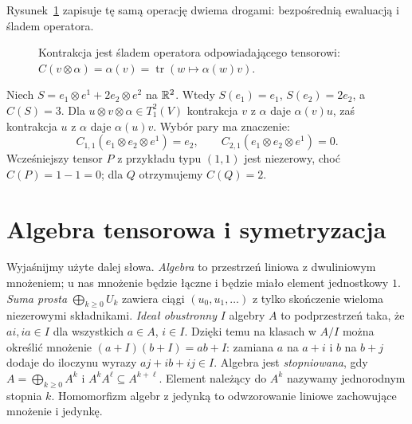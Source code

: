 Rysunek~\ref{fig:kontrakcja-slad} zapisuje tę samą operację
dwiema drogami: bezpośrednią ewaluacją i śladem operatora.
\begin{figure}[H]
\centering
{}
\caption{Kontrakcja jest śladem operatora odpowiadającego tensorowi:
$C(v\otimes\alpha)=\alpha(v)=\operatorname{tr}(w\mapsto\alpha(w)v)$.}
\label{fig:kontrakcja-slad}
\end{figure}

\begin{przyklad}
Niech $S=e_1\otimes e^1+2e_2\otimes e^2$ na $\mathbb{R}^2$.
Wtedy $S(e_1)=e_1$, $S(e_2)=2e_2$, a $C(S)=3$.
Dla $u\otimes v\otimes\alpha\in T^2_1(V)$ kontrakcja
$v$ z $\alpha$ daje $\alpha(v)u$, zaś kontrakcja
$u$ z $\alpha$ daje $\alpha(u)v$. Wybór pary ma znaczenie:
\[
 C_{1,1}(e_1\otimes e_2\otimes e^1)=e_2,
 \qquad C_{2,1}(e_1\otimes e_2\otimes e^1)=0.
\]
Wcześniejszy tensor $P$ z przykładu typu $(1,1)$ jest niezerowy,
choć $C(P)=1-1=0$; dla $Q$ otrzymujemy $C(Q)=2$.
\end{przyklad}

\section{Algebra tensorowa i symetryzacja}
\label{sec:algebra-tensorowa}

Wyjaśnijmy użyte dalej słowa. \emph{Algebra} to przestrzeń
liniowa z dwuliniowym mnożeniem; u nas mnożenie będzie
łączne i będzie miało element jednostkowy $1$.
\emph{Suma prosta} $\bigoplus_{k\geq0}U_k$ zawiera ciągi
$(u_0,u_1,\ldots)$ z tylko skończenie wieloma niezerowymi
składnikami. \emph{Ideał obustronny} $I$ algebry $A$ to
podprzestrzeń taka, że $ai,ia\in I$ dla wszystkich
$a\in A$, $i\in I$. Dzięki temu na klasach w $A/I$
można określić mnożenie $(a+I)(b+I)=ab+I$:
zamiana $a$ na $a+i$ i $b$ na $b+j$ dodaje do
iloczynu wyrazy $aj+ib+ij\in I$. Algebra jest
\emph{stopniowana}, gdy $A=\bigoplus_{k\geq0}A^k$
i $A^kA^\ell\subseteq A^{k+\ell}$. Element należący do $A^k$ nazywamy
jednorodnym stopnia $k$. Homomorfizm algebr z jedynką to
odwzorowanie liniowe zachowujące mnożenie i jedynkę.

